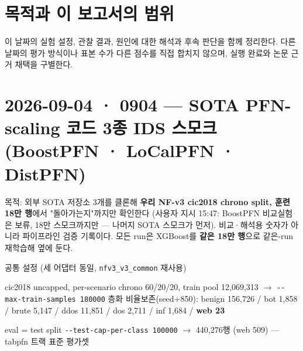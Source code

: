 




\section*{목적과 이 보고서의 범위}

이 날짜의 실험 설정, 관찰 결과, 원인에 대한 해석과 후속 판단을 함께 정리한다. 다른 날짜의 평가 방식이나 표본 수가 다른 점수를 직접 합치지 않으며, 실행 완료와 논문 근거 채택을 구별한다.


\section{2026-09-04 · 0904 — SOTA PFN-scaling 코드 3종 IDS 스모크 (BoostPFN · LoCalPFN · DistPFN)}
\label{report:20260904_0904}
목적: 외부 SOTA 저장소 3개를 클론해 \textbf{우리 NF-v3 cic2018 chrono split, 훈련 18만 행}에서 "돌아가는지"까지만 확인한다 (사용자 지시 15:47: BoostPFN 비교실험은 보류, 18만 스모크까지만 — 나머지 SOTA 스모크가 먼저). 비교·해석용 숫자가 아니라 파이프라인 검증 기록이다. 모든 run은 XGBoost를 \textbf{같은 18만 행}으로 같은-run 재학습해 옆에 둔다.

공통 설정 (세 어댑터 동일, \texttt{nfv3\_\allowbreak{}\allowbreak{}v3\_\allowbreak{}\allowbreak{}common} 재사용)

\par\noindent \textbullet\enspace cic2018 uncapped, per-scenario chrono 60/\allowbreak{}20/\allowbreak{}20, train pool 12,069,313  \ensuremath{\rightarrow}  \texttt{-\allowbreak{}-\allowbreak{}max-\allowbreak{}tr\allowbreak{}ain-\allowbreak{}samp\allowbreak{}les 1800\allowbreak{}00} 층화 비율보존(seed+\allowbreak{}850): benign 156,726 /\allowbreak{} bot 1,858 /\allowbreak{} brute 5,147 /\allowbreak{} ddos 11,851 /\allowbreak{} dos 2,711 /\allowbreak{} inf 1,684 /\allowbreak{} \textbf{web 23}


\par\noindent \textbullet\enspace eval =\allowbreak{} test split \texttt{-\allowbreak{}-\allowbreak{}test-\allowbreak{}c\allowbreak{}ap-\allowbreak{}per-\allowbreak{}c\allowbreak{}lass 100\allowbreak{}000}  \ensuremath{\rightarrow}  440,276행 (web 509) — tabpfn 트랙 표준 평가셋


